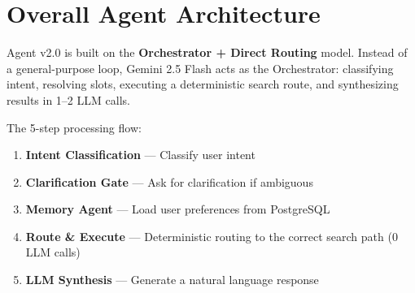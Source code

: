 \section{Overall Agent Architecture}
Agent v2.0 is built on the \textbf{Orchestrator + Direct Routing} model. Instead of a general-purpose loop, Gemini 2.5 Flash acts as the Orchestrator: classifying intent, resolving slots, executing a deterministic search route, and synthesizing results in 1--2 LLM calls.

The 5-step processing flow:
\begin{enumerate}
    \item \textbf{Intent Classification} --- Classify user intent
    \item \textbf{Clarification Gate} --- Ask for clarification if ambiguous
    \item \textbf{Memory Agent} --- Load user preferences from PostgreSQL
    \item \textbf{Route \& Execute} --- Deterministic routing to the correct search path (0 LLM calls)
    \item \textbf{LLM Synthesis} --- Generate a natural language response
\end{enumerate}

